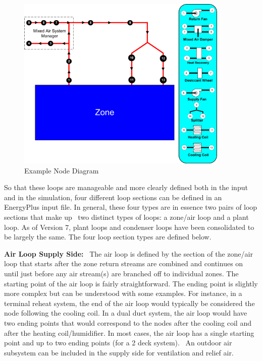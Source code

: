 \begin{figure}[hbtp] %
\centering
\includegraphics[width=0.9\textwidth, height=0.9\textheight, keepaspectratio=true]{media/image134.png}
\caption{Example Node Diagram \protect \label{fig:example-node-diagram}}
\end{figure}

So that these loops are manageable and more clearly defined both in the input and in the simulation, four different loop sections can be defined in an EnergyPlus input file. In general, these four types are in essence two pairs of loop sections that make up~ two distinct types of loops: a zone/air loop and a plant loop. As of Version 7, plant loops and condenser loops have been consolidated to be largely the same. The four loop section types are defined below.

\textbf{Air Loop Supply Side:}~ The air loop is defined by the section of the zone/air loop that starts after the zone return streams are combined and continues on until just before any air stream(s) are branched off to individual zones. The starting point of the air loop is fairly straightforward. The ending point is slightly more complex but can be understood with some examples. For instance, in a terminal reheat system, the end of the air loop would typically be considered the node following the cooling coil. In a dual duct system, the air loop would have two ending points that would correspond to the nodes after the cooling coil and after the heating coil/humidifier. In most cases, the air loop has a single starting point and up to two ending points (for a 2 deck system).~ An outdoor air subsystem can be included in the supply side for ventilation and relief air.

